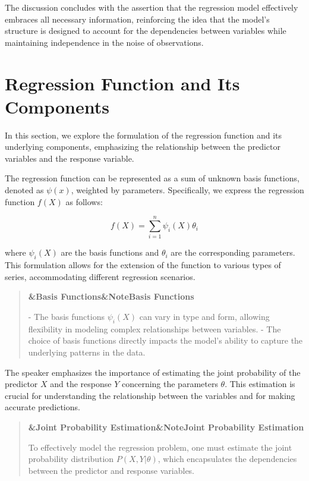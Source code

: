\documentclass[a4paper]{article}
\newcommand{\boxheading}[1]{%
  \par\smallskip
  \noindent\textbf{\ifx&#1&Note\else#1\fi}\par
  \smallskip
}
\newenvironment{exbox}[1][]{%
  \begin{quote}\color{brown!70!black}\boxheading{#1}\normalcolor
}{\end{quote}}
\newenvironment{rembox}[1][]{%
  \begin{quote}\color{black!70}\boxheading{#1}\normalcolor
}{\end{quote}}
\begin{document}
The discussion concludes with the assertion that the regression model effectively embraces all necessary information, reinforcing the idea that the model's structure is designed to account for the dependencies between variables while maintaining independence in the noise of observations.

\section{Regression Function and Its Components}
In this section, we explore the formulation of the regression function and its underlying components, emphasizing the relationship between the predictor variables and the response variable.

The regression function can be represented as a sum of unknown basis functions, denoted as \( \psi(x) \), weighted by parameters. Specifically, we express the regression function \( f(X) \) as follows:

\begin{equation}
f(X) = \sum_{i=1}^{n} \psi_i(X) \theta_i
\end{equation}

where \( \psi_i(X) \) are the basis functions and \( \theta_i \) are the corresponding parameters. This formulation allows for the extension of the function to various types of series, accommodating different regression scenarios.

\begin{rembox}[Basis Functions]
- The basis functions \( \psi_i(X) \) can vary in type and form, allowing flexibility in modeling complex relationships between variables.
- The choice of basis functions directly impacts the model's ability to capture the underlying patterns in the data.
\end{rembox}

The speaker emphasizes the importance of estimating the joint probability of the predictor \( X \) and the response \( Y \) concerning the parameters \( \theta \). This estimation is crucial for understanding the relationship between the variables and for making accurate predictions.

\begin{exbox}[Joint Probability Estimation]
To effectively model the regression problem, one must estimate the joint probability distribution \( P(X, Y | \theta) \), which encapsulates the dependencies between the predictor and response variables.
\end{exbox}
\end{document}
